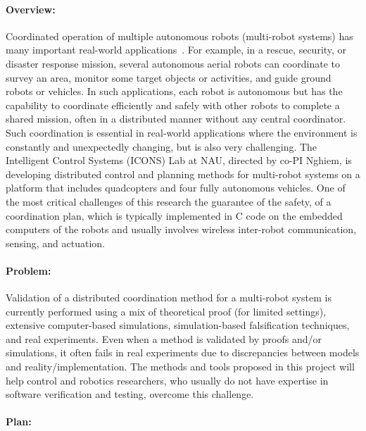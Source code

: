 
\paragraph{Overview:}

Coordinated operation of multiple autonomous robots (multi-robot systems) has many important real-world applications~\cite{multirobot2005,multirobotsurvey2013}.
For example, in a rescue, security, or disaster response mission, several autonomous aerial robots can coordinate to survey an area, monitor some target objects or activities, and guide ground robots or vehicles.
In such applications, each robot is autonomous but has the capability to coordinate efficiently and safely with other robots to complete a shared mission, often in a distributed manner without any central coordinator.
Such coordination is essential in real-world applications where the environment is constantly and unexpectedly changing, but is also very challenging.
The Intelligent Control Systems (ICONS) Lab at NAU, directed by co-PI Nghiem, is developing distributed control and planning methods for multi-robot systems on a platform that includes quadcopters and four fully autonomous vehicles.
One of the most critical challenges of this research the guarantee of the safety, of a coordination plan, which is typically implemented in C code on the embedded computers of the robots and usually involves wireless inter-robot communication, sensing, and actuation.

\paragraph{Problem:}

Validation of a distributed coordination method for a multi-robot system is currently performed using a mix of theoretical proof (for limited settings), extensive computer-based simulations, simulation-based falsification techniques, and real experiments.
Even when a method is validated by proofs and/or simulations, it often fails in real experiments due to discrepancies between models and reality/implementation.
The methods and tools proposed in this project will help control and robotics researchers, who usually do not have expertise in software verification and testing, overcome this challenge.


\paragraph{Plan:}

